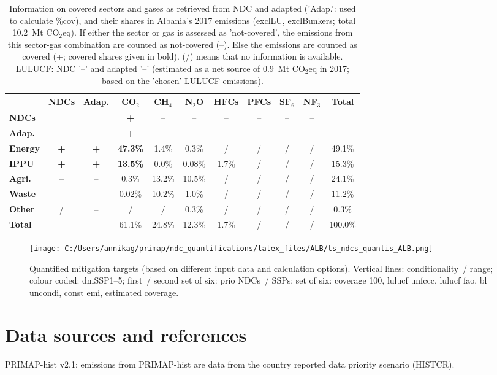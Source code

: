 \documentclass[12pt]{article}
\begin{document}
 \begin{table}[htbp]\small
 \centering
 \caption{Information on covered sectors and gases as retrieved from NDC and adapted ('Adap.': used to calculate \%cov), and their shares in Albania's 2017 emissions (exclLU, exclBunkers; total 10.2~Mt CO$_2$eq).
 If either the sector or gas is assessed as 'not-covered', the emissions from this sector-gas combination are counted as not-covered (--). 
 Else the emissions are counted as covered (+; covered shares given in bold).
 (/) means that no information is available.
 LULUCF: NDC '--' and adapted '--' (estimated as a net source of 0.9~Mt CO$_2$eq in 2017; based on the 'chosen' LULUCF emissions).}
 \label{tab:coveredSectorsGases}
 \begin{tabular}{l || c c || c c c c c c c | c}
 \bfseries  & \bfseries NDCs & \bfseries Adap. & \bfseries CO$_2$ & \bfseries CH$_4$ & \bfseries N$_2$O & \bfseries HFCs & \bfseries PFCs & \bfseries SF$_6$ & \bfseries NF$_3$ & \bfseries Total \tabularnewline \hline \hline
 \bfseries NDCs &  &  & \bfseries + & -- & -- & -- & -- & -- & -- &  \tabularnewline 
 \bfseries Adap. &  &  & \bfseries + & -- & -- & -- & -- & -- & -- &  \tabularnewline \hline \hline
 \bfseries Energy & \bfseries + & \bfseries + & \bfseries 47.3\% & 1.4\% & 0.3\% & / & / & / & / & 49.1\% \tabularnewline 
 \bfseries IPPU & \bfseries + & \bfseries + & \bfseries 13.5\% & 0.0\% & 0.08\% & 1.7\% & / & / & / & 15.3\% \tabularnewline 
 \bfseries Agri. & -- & -- & 0.3\% & 13.2\% & 10.5\% & / & / & / & / & 24.1\% \tabularnewline 
 \bfseries Waste & -- & -- & 0.02\% & 10.2\% & 1.0\% & / & / & / & / & 11.2\% \tabularnewline 
 \bfseries Other & / & -- & / & / & 0.3\% & / & / & / & / & 0.3\% \tabularnewline \hline
 \bfseries Total &  &  & 61.1\% & 24.8\% & 12.3\% & 1.7\% & / & / & / & 100.0\% \tabularnewline 
 \end{tabular}
 \end{table}
 \begin{figure}[htbp]
 \centering
 \texttt{[image: C:/Users/annikag/primap/ndc\_quantifications/latex\_files/ALB/ts\_ndcs\_quantis\_ALB.png]}
 \caption{Quantified mitigation targets (based on different input data and calculation options).
 Vertical lines: conditionality~/ range;
 colour coded: dmSSP1--5;
 first~/ second set of six: prio NDCs~/ SSPs;
 set of six: coverage 100, lulucf unfccc, lulucf fao, bl uncondi, const emi, estimated coverage.}
 \label{fig:miti}
 \end{figure}

 \section{Data sources and references}
 \label{sec:dataSourcesRefs}
 PRIMAP-hist v2.1: emissions from PRIMAP-hist are data from the country reported data priority scenario (HISTCR).

 
\end{document}
